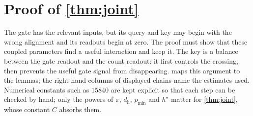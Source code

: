 \section{Proof of \texorpdfstring{\cref{thm:joint}}{Theorem 4}}
\label{app:joint}

\providecommand{\why}[1]{\text{\small(#1)}}

The gate has the relevant inputs, but its query and key may begin with the wrong alignment and its readouts begin at zero.
The proof must show that these coupled parameters find a useful interaction and keep it. The key is a balance between the gate
readout and the count readout: it first controls the crossing, then prevents the useful gate signal from disappearing.
 maps this argument to the lemmas; the right-hand columns of displayed chains name the estimates used. Numerical
constants such as $15840$ are kept explicit so that each step can be checked by hand; only the powers of $\varepsilon$, $d_{\mathrm h}$,
$p_{\min}$ and $h^\star$ matter for \cref{thm:joint}, whose constant $C$ absorbs them.

